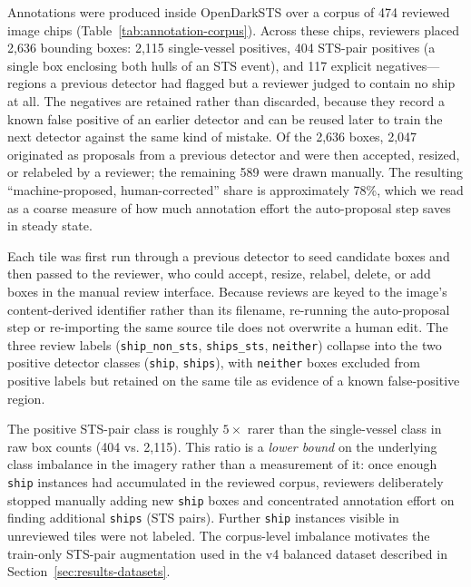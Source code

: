 \documentclass[10pt, letterpaper, twocolumn]{article}
\begin{document}
Annotations were produced inside OpenDarkSTS over a corpus of 474 reviewed image chips (Table~\ref{tab:annotation-corpus}). Across these chips, reviewers placed 2{,}636 bounding boxes: 2{,}115 single-vessel positives, 404 STS-pair positives (a single box enclosing both hulls of an STS event), and 117 explicit negatives---regions a previous detector had flagged but a reviewer judged to contain no ship at all. The negatives are retained rather than discarded, because they record a known false positive of an earlier detector and can be reused later to train the next detector against the same kind of mistake. Of the 2{,}636 boxes, 2{,}047 originated as proposals from a previous detector and were then accepted, resized, or relabeled by a reviewer; the remaining 589 were drawn manually. The resulting ``machine-proposed, human-corrected'' share is approximately 78\%, which we read as a coarse measure of how much annotation effort the auto-proposal step saves in steady state.

Each tile was first run through a previous detector to seed candidate boxes and then passed to the reviewer, who could accept, resize, relabel, delete, or add boxes in the manual review interface. Because reviews are keyed to the image's content-derived identifier rather than its filename, re-running the auto-proposal step or re-importing the same source tile does not overwrite a human edit. The three review labels (\texttt{ship\_non\_sts}, \texttt{ships\_sts}, \texttt{neither}) collapse into the two positive detector classes (\texttt{ship}, \texttt{ships}), with \texttt{neither} boxes excluded from positive labels but retained on the same tile as evidence of a known false-positive region.

The positive STS-pair class is roughly $5\times$ rarer than the single-vessel class in raw box counts (404 vs. 2{,}115). This ratio is a \emph{lower bound} on the underlying class imbalance in the imagery rather than a measurement of it: once enough \texttt{ship} instances had accumulated in the reviewed corpus, reviewers deliberately stopped manually adding new \texttt{ship} boxes and concentrated annotation effort on finding additional \texttt{ships} (STS pairs). Further \texttt{ship} instances visible in unreviewed tiles were not labeled. The corpus-level imbalance motivates the train-only STS-pair augmentation used in the v4 balanced dataset described in Section~\ref{sec:results-datasets}.
\end{document}
